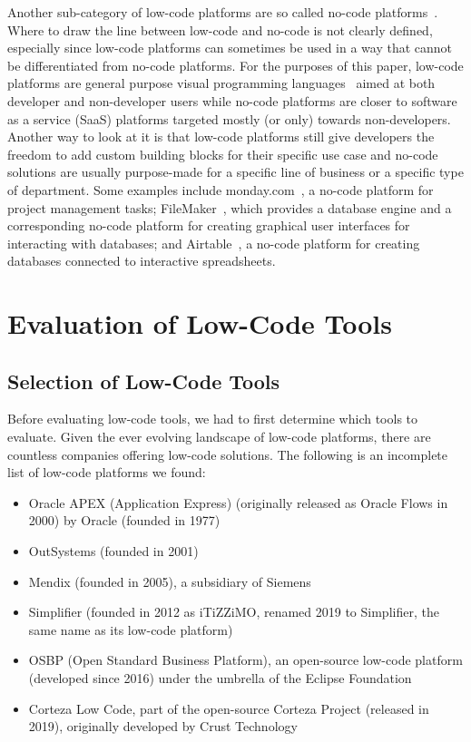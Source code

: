 \documentclass[runningheads]{llncs}
\begin{document}
Another sub-category of low-code platforms are so called no-code platforms~\cite{wiki:no_code_development_platform}. Where to draw the line between low-code and no-code is not clearly defined, especially since low-code platforms can sometimes be used in a way that cannot be differentiated from no-code platforms. For the purposes of this paper, low-code platforms are general purpose visual programming languages~\cite{wiki:visual_programming_language} aimed at both developer and non-developer users while no-code platforms are closer to software as a service (SaaS) platforms targeted mostly (or only) towards non-developers. Another way to look at it is that low-code platforms still give developers the freedom to add custom building blocks for their specific use case and no-code solutions are usually purpose-made for a specific line of business or a specific type of department. Some examples include monday.com~\cite{wiki:monday_com}, a no-code platform for project management tasks; FileMaker~\cite{wiki:filemaker}, which provides a database engine and a corresponding no-code platform for creating graphical user interfaces for interacting with databases; and Airtable~\cite{wiki:airtable}, a no-code platform for creating databases connected to interactive spreadsheets.

\section{Evaluation of Low-Code Tools}
\label{sec:evaluation_of_low_code_tools}

\subsection{Selection of Low-Code Tools}
\label{subsec:choosing_low_code_tools}

Before evaluating low-code tools, we had to first determine which tools to evaluate. Given the ever evolving landscape of low-code platforms, there are countless companies offering low-code solutions. The following is an incomplete list of low-code platforms we found:

\begin{itemize}
  \item Oracle APEX (Application Express) (originally released as Oracle Flows in 2000) by Oracle (founded in 1977)
  \item OutSystems (founded in 2001)
  \item Mendix (founded in 2005), a subsidiary of Siemens
  \item Simplifier (founded in 2012 as iTiZZiMO, renamed 2019 to Simplifier, the same name as its low-code platform)
  \item OSBP (Open Standard Business Platform), an open-source low-code platform (developed since 2016) under the umbrella of the Eclipse Foundation
  \item Corteza Low Code, part of the open-source Corteza Project (released in 2019), originally developed by Crust Technology
\end{itemize}
\end{document}
